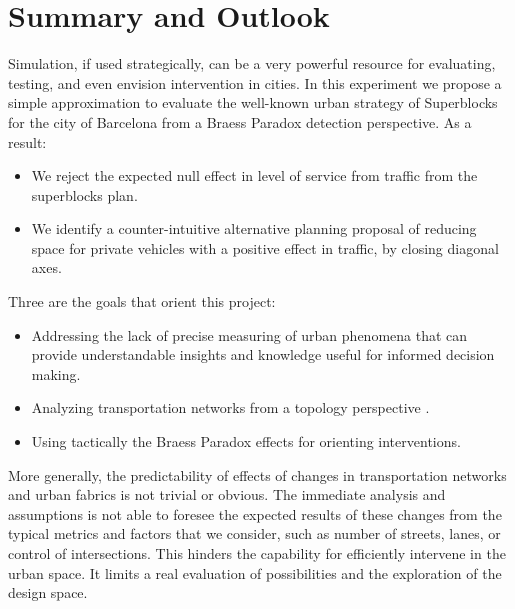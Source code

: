 \documentclass[11pt]{article}
\begin{document}
\section{Summary and Outlook}
Simulation, if used strategically, can be a very powerful resource for evaluating, testing, and even envision intervention in cities. In this experiment we propose a simple approximation to evaluate the well-known urban strategy of Superblocks for the city of Barcelona from a Braess Paradox detection perspective. As a result:
\begin{itemize}
\setlength\itemsep{0.05em}
    \item We reject the expected null effect in level of service from traffic from the superblocks plan.
    \item We identify a counter-intuitive alternative planning proposal of reducing space for private vehicles with a positive effect in traffic, by closing diagonal axes.
\end{itemize}
Three are the goals that orient this project:
\begin{itemize}
\setlength\itemsep{0.05em}
    \item Addressing the lack of precise measuring of urban phenomena that can provide understandable insights and knowledge useful for informed decision making.
    \item Analyzing transportation networks from a topology perspective \citep{Wang2017}.
    \item Using tactically the Braess Paradox effects for orienting interventions.
\end{itemize}
More generally, the predictability of effects of changes in transportation networks and urban fabrics is not trivial or obvious. The immediate analysis and assumptions is not able to foresee the expected results of these changes from the typical metrics and factors that we consider, such as number of streets, lanes, or control of intersections. This hinders the capability for efficiently intervene in the urban space. It limits a real evaluation of possibilities and the exploration of the design space.



\end{document}
